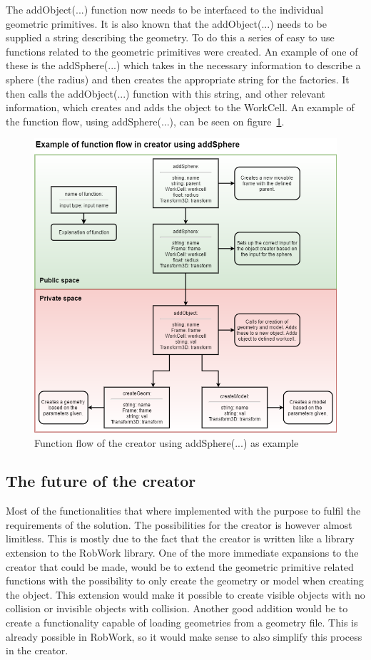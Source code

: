 The addObject(...) function now needs to be interfaced to the individual geometric primitives. It is also known that the addObject(...) needs to be supplied a string describing the geometry. To do this a series of easy to use functions related to the geometric primitives were created. An example of one of these is the addSphere(...) which takes in the necessary information to describe a sphere (the radius) and then creates the appropriate string for the factories. It then calls the addObject(...) function with this string, and other relevant information, which creates and adds the object to the WorkCell. An example of the function flow, using addSphere(...), can be seen on figure~\ref{fig:CreatorFlow}.

\begin{figure}[h]
	\centering
	\includegraphics[scale=0.55]{Figures/CreatorFlow.png}
	\caption{Function flow of the creator using addSphere(...) as example}
	\label{fig:CreatorFlow}
\end{figure}

\subsection{The future of the creator}
\label{subsec:futureCreator}
Most of the functionalities that where implemented with the purpose to fulfil the requirements of the solution. The possibilities for the creator is however almost limitless. This is mostly due to the fact that the creator is written like a library extension to the RobWork library. One of the more immediate expansions to the creator that could be made, would be to extend the geometric primitive related functions with the possibility to only create the geometry or model when creating the object. This extension would make it possible to create visible objects with no collision or invisible objects with collision. Another good addition would be to create a functionality capable of loading geometries from a geometry file. This is already possible in RobWork, so it would make sense to also simplify this process in the creator.